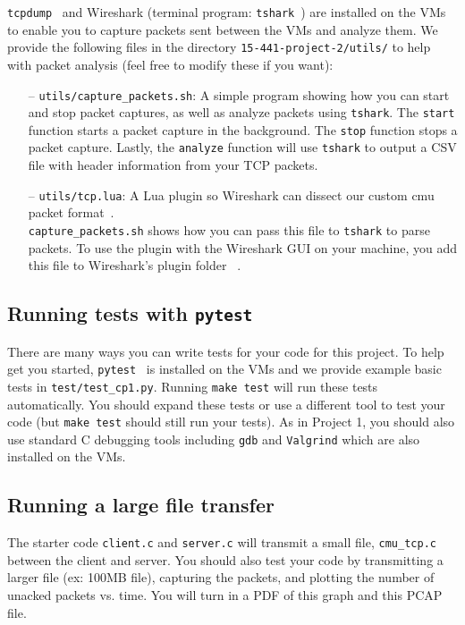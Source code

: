 \texttt{tcpdump}~\cite{tcpdump}  and Wireshark (terminal program: \texttt{tshark}~\cite{tshark}) are installed on the VMs to enable you to capture packets sent between the VMs and analyze them. We provide the following files in the directory \texttt{15-441-project-2/utils/} to help with packet analysis  (feel free to modify these if you want):
\begin{itemize}
    \item[--] \texttt{utils/capture\_packets.sh}: A simple program showing how you can start and stop packet captures, as well as analyze packets using \texttt{tshark}. The \texttt{start} function starts a packet capture in the background. The \texttt{stop} function stops a packet capture. Lastly, the \texttt{analyze} function will use \texttt{tshark} to output a CSV file with header information from your TCP packets.
    
    \item[--] \texttt{utils/tcp.lua}: A Lua plugin so Wireshark can dissect our custom cmu packet format~\cite{wireshark-dissector}. \\ \texttt{capture\_packets.sh} shows how you can pass this file to \texttt{tshark} to parse packets. To use the plugin with the Wireshark GUI on your machine, you add this file to Wireshark's plugin folder ~\cite{wireshark-plugin}.
\end{itemize}

\subsection{Running tests with \texttt{pytest}}

There are many ways you can write tests for your code for this project. To help get you started, \texttt{pytest}~\cite{pytest} is installed on the VMs and we provide example basic tests in \texttt{test/test\_cp1.py}. Running \texttt{make test} will run these tests automatically. You should expand these tests or use a different tool to test your code (but \texttt{make test} should still run your tests). As in Project 1, you should also use standard C debugging tools including \texttt{gdb} and \texttt{Valgrind} which are also installed on the VMs. 


\subsection{Running a large file transfer}
The starter code \texttt{client.c} and \texttt{server.c} will transmit a small file, \texttt{cmu\_tcp.c} between the client and server. You should also test your code by transmitting a larger file (ex: 100MB file), capturing the packets, and plotting the number of unacked packets vs. time. You will turn in a PDF of this graph and this PCAP file. \\

